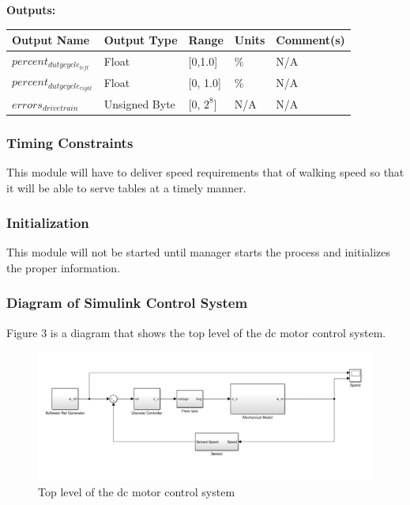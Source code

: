\documentclass [10pt]{article}
\begin{document}
\textbf{Outputs: } \\
\begin{longtable}{|l|l|l|l|l|}\hline 
	\rowcolor{tableCell}\textbf{Output Name} & \textbf{Output Type} & \textbf{Range} & \textbf{Units} & \textbf{Comment(s)} \\ \hline
	$ percent_{dutycycle_{left}} $ & Float & [0,1.0] & \% &  N/A\\ \hline
	\rowcolor{tableCell}$ percent_{dutycycle_{right}} $ & Float & [0, 1.0]& \% & N/A\\ \hline
	$ errors_{drivetrain} $ & Unsigned Byte & [0, $2^{8}$]& N/A & N/A\\ \hline
\end{longtable}



\subsubsection{Timing Constraints}
This module will have to deliver speed requirements that of walking speed so that it will be able to serve tables at a timely manner.


\subsubsection{Initialization}
This module will not be started until manager starts the process and initializes the proper information.


\subsubsection{Diagram of Simulink Control System}
Figure 3 is a diagram that shows the top level of the dc motor control system. 
\begin{figure} [h!]
	\centering
	\includegraphics [scale = 0.4] {Figures/Simulink.png}
	\caption{Top level of the dc motor control system}
\end{figure}
\end{document}
